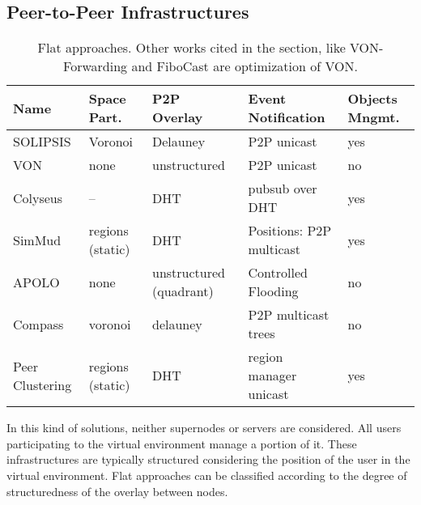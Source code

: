 \documentclass[final,10pt,a5paper]{phdimt}
\theoremstyle{definition}
\begin{document}
\subsection{Peer-to-Peer Infrastructures}

\begin{table}[tbh]
\centering
\begin{tabular}{|p{2.2cm}|p{1.3cm}|p{2.1cm}|p{2.2cm}|p{1.2cm}|}
\hline
Name & Space \newline Part. & P2P \newline Overlay & Event \newline Notification & Objects \newline Mngmt. \\
\hline
\hline
SOLIPSIS \cite{Frey2008} & Voronoi & Delauney & P2P unicast & yes \\ \hline
VON \cite{Hu2006} & none & unstructured & P2P unicast & no \\
\hline 
Colyseus \cite{Bharambea} & -- & DHT & pubsub over DHT & yes \\ \hline
SimMud \cite{Knutsson2004} & regions (static) & DHT & Positions: P2P multicast & yes \\ \hline
APOLO \cite{lee2006apolo} & none & unstructured (quadrant) & Controlled Flooding & no \\
\hline
Compass \cite{ricci2011aoi} & voronoi & delauney & P2P multicast trees & no \\
\hline
Peer Clustering \cite{Chen} & regions (static) & DHT & region manager unicast &  yes \\ 
\hline
\end{tabular}
\caption{Flat approaches. Other works cited in the section, like VON-Forwarding \cite{chen2007forwarding} and FiboCast \cite{Jiang2009} are optimization of VON.}\label{tab:flat}
\end{table}


In this kind of solutions, neither supernodes or servers are considered. 
All users participating to the virtual environment manage a portion of it.
These infrastructures are typically structured considering the position of the user in the virtual environment.
Flat approaches can be classified according to the degree of structuredness of the overlay between nodes.
\end{document}
